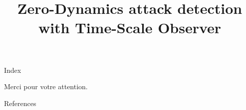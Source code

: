 \documentclass[ieee,english]{slides}
\title{Zero-Dynamics attack detection with Time-Scale Observer}
\begin{document}
\maketitle{}

\begin{slide}{Index}
  \begin{minipage}[t][0.4\textheight][t]{0.45\textwidth}
    \tableofcontents[sections={1-4}]
  \end{minipage}
  \begin{minipage}[t][0.4\baselineskip][t]{0.45\textwidth}
    \tableofcontents[sections={5-}]
  \end{minipage}
  \vfill\null{}
\end{slide}









\begin{slide}{}
  \vspace*{\fill}
  \begin{center}
    \textcolor{fg}{\Large{Merci pour votre attention.}}
  \end{center}
  \vspace*{\fill}
\end{slide}

\begin{slide}[allowframebreaks]{References}
  \nocite{*}
  \printbibliography{}
\end{slide}
\end{document}
